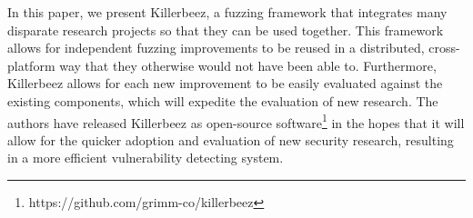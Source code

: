 In this paper, we present Killerbeez, a fuzzing framework that integrates many
disparate research projects so that they can be used together. This framework
allows for independent fuzzing improvements to be reused in a distributed,
cross-platform way that they otherwise would not have been able to. Furthermore,
Killerbeez allows for each new improvement to be easily evaluated against the
existing components, which will expedite the evaluation of new research.  The
authors have released Killerbeez as open-source
software\footnote{https://github.com/grimm-co/killerbeez} in the hopes that it
will allow for the quicker adoption and evaluation of new security research,
resulting in a more efficient vulnerability detecting system.
